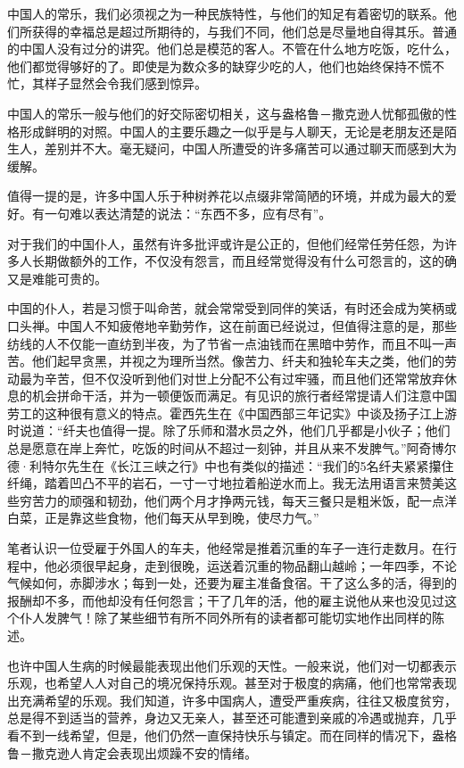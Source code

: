 \documentclass[12pt,oneside]{book}
\begin{document}
\begin{common-format}
中国人的常乐，我们必须视之为一种民族特性，与他们的知足有着密切的联系。他们所获得的幸福总是超过所期待的，与我们不同，他们总是尽量地自得其乐。普通的中国人没有过分的讲究。他们总是模范的客人。不管在什么地方吃饭，吃什么，他们都觉得够好的了。即使是为数众多的缺穿少吃的人，他们也始终保持不慌不忙，其样子显然会令我们感到惊异。 

中国人的常乐一般与他们的好交际密切相关，这与盎格鲁－撒克逊人忧郁孤傲的性格形成鲜明的对照。中国人的主要乐趣之一似乎是与人聊天，无论是老朋友还是陌生人，差别并不大。毫无疑问，中国人所遭受的许多痛苦可以通过聊天而感到大为缓解。 

值得一提的是，许多中国人乐于种树养花以点缀非常简陋的环境，并成为最大的爱好。有一句难以表达清楚的说法：“东西不多，应有尽有”。 

对于我们的中国仆人，虽然有许多批评或许是公正的，但他们经常任劳任怨，为许多人长期做额外的工作，不仅没有怨言，而且经常觉得没有什么可怨言的，这的确又是难能可贵的。 

中国的仆人，若是习惯于叫命苦，就会常常受到同伴的笑话，有时还会成为笑柄或口头禅。中国人不知疲倦地辛勤劳作，这在前面已经说过，但值得注意的是，那些纺线的人不仅能一直纺到半夜，为了节省一点油钱而在黑暗中劳作，而且不叫一声苦。他们起早贪黑，并视之为理所当然。像苦力、纤夫和独轮车夫之类，他们的劳动最为辛苦，但不仅没听到他们对世上分配不公有过牢骚，而且他们还常常放弃休息的机会拼命干活，并为一顿便饭而满足。有见识的旅行者经常提请人们注意中国劳工的这种很有意义的特点。霍西先生在《中国西部三年记实》中谈及扬子江上游时说道：“纤夫也值得一提。除了乐师和潜水员之外，他们几乎都是小伙子；他们总是愿意在岸上奔忙，吃饭的时间从不超过一刻钟，并且从来不发脾气。”阿奇博尔德·利特尔先生在《长江三峡之行》中也有类似的描述：“我们的5名纤夫紧紧攥住纤绳，踏着凹凸不平的岩石，一寸一寸地拉着船逆水而上。我无法用语言来赞美这些穷苦力的顽强和韧劲，他们两个月才挣两元钱，每天三餐只是粗米饭，配一点洋白菜，正是靠这些食物，他们每天从早到晚，使尽力气。” 

笔者认识一位受雇于外国人的车夫，他经常是推着沉重的车子一连行走数月。在行程中，他必须很早起身，走到很晚，运送着沉重的物品翻山越岭；一年四季，不论气候如何，赤脚涉水；每到一处，还要为雇主准备食宿。干了这么多的活，得到的报酬却不多，而他却没有任何怨言；干了几年的活，他的雇主说他从来也没见过这个仆人发脾气！除了某些细节有所不同外所有的读者都可能切实地作出同样的陈述。 

也许中国人生病的时候最能表现出他们乐观的天性。一般来说，他们对一切都表示乐观，也希望人人对自己的境况保持乐观。甚至对于极度的病痛，他们也常常表现出充满希望的乐观。我们知道，许多中国病人，遭受严重疾病，往往又极度贫穷，总是得不到适当的营养，身边又无亲人，甚至还可能遭到亲戚的冷遇或抛弃，几乎看不到一线希望，但是，他们仍然一直保持快乐与镇定。而在同样的情况下，盎格鲁－撒克逊人肯定会表现出烦躁不安的情绪。 


\end{common-format}
\end{document}
